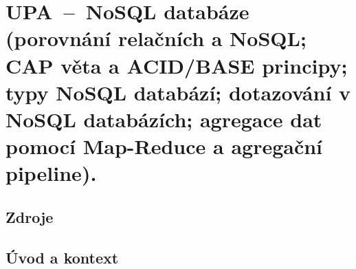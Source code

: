 

\graphicspath{{upa/nosql/figures}}


\chapter{UPA~--~NoSQL databáze (porovnání relačních a NoSQL; CAP věta a ACID/BASE principy; typy NoSQL databází; dotazování v NoSQL databázích; agregace dat pomocí Map-Reduce a agregační pipeline).}


\section{Zdroje}

\begin{compactitem}
    \item {}
\end{compactitem}


\section{Úvod a kontext}

